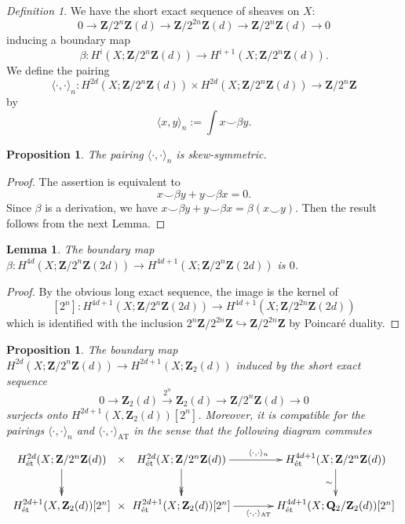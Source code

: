 \documentclass[10pt, reqno]{amsart}
\numberwithin{equation}{subsection}
\newcommand{\Q}{\mathbf{Q}}
\newcommand{\Z}{\mathbf{Z}}
\newcommand{\mrm}[1]{\mathrm{#1}}
\newcommand{\co}{\colon}
\DeclareMathOperator{\et}{\acute{e}t}
\newtheorem{lemma}[thm]{Lemma}
\newtheorem{prop}[thm]{Proposition}
\theoremstyle{remark}
\newtheorem{defn}[thm]{Definition}
\begin{document}
\begin{defn}\label{def: pairing mod 2^n} We have the short exact sequence of sheaves on $X$:
\[
0 \rightarrow \Z/2^n\Z(d) \rightarrow  \Z/2^{2n} \Z(d) \rightarrow \Z/2^n\Z(d) \rightarrow 0
\]
inducing a boundary map 
\[
\beta \colon H^i_{\et}(X; \Z/2^n\Z(d)) \rightarrow H^{i+1}_{\et}(X; \Z/2^n\Z(d)).
\] 
We define the pairing 
\[
\langle \cdot , \cdot \rangle_{n} \colon H^{2d}_{\et}(X; \Z/2^n\Z(d)) \times H^{2d}_{\et}(X; \Z/2^n\Z(d)) \rightarrow \Z/2^n\Z
\]
by 
\[
\langle x, y \rangle_n := \int x \smile \beta y .
\]
\end{defn}

\begin{prop}\label{prop: skew-symmetric}
The pairing $\langle \cdot , \cdot \rangle_n$ is skew-symmetric. 
\end{prop} 

\begin{proof}
The assertion is equivalent to 
\[
x \smile \beta y  + y \smile \beta  x  = 0.
\]
Since $\beta$ is a derivation, we have $ x \smile \beta y  + y \smile \beta  x  = \beta(x \smile y)$. Then the result follows from the next Lemma. 
\end{proof}

\begin{lemma}\label{lem: top boundary vanishes}
The boundary map $\beta  \colon H^{4d}_{\et}(X; \Z/2^n\Z(2d)) \rightarrow  H^{4d+1}_{\et}(X; \Z/2^n\Z(2d))$ is $0$. 
\end{lemma}

\begin{proof}
By the obvious long exact sequence, the image is the kernel of 
\[
[2^{n}] \co H^{4d+1}_{\et}(X; \Z/2^n\Z(2d)) \rightarrow H^{4d+1}_{\et}(X; \Z/2^{2n}\Z(2d))
\]
which is identified with the inclusion $2^n \Z/2^{2n}\Z \hookrightarrow \Z/2^{2n}\Z$ by Poincar\'{e} duality. 
\end{proof}


\begin{prop}\label{prop: compatibility}
The boundary map $H^{2d}_{\et}(X; \Z/2^n\Z(d)) \rightarrow H^{2d+1}_{\et}(X; \Z_2(d))$ induced by the short exact sequence 
\[
0 \rightarrow \Z_2(d)  \xrightarrow{2^n} \Z_2(d) \rightarrow \Z/2^n\Z(d) \rightarrow 0
\]
surjects onto $H^{2d+1}_{\et}(X, \Z_2(d))[2^n]$. Moreover, it is compatible for the pairings $\langle \cdot , \cdot \rangle_n$ and $\langle \cdot , \cdot \rangle_{\mrm{AT}}$ in the sense that the following diagram commutes
\[
\xymatrix @C=0pc{
H^{2d}_{\et}(X; \Z/2^n\Z(d)) \ar@{->>}[d] & \times &  H^{2d}_{\et}(X; \Z/2^n\Z(d))  \ar@{->>}[d]  \ar[rrrrrrr]^{\langle \cdot , \cdot \rangle_n} &&&&&&& H^{4d+1}_{\et}(X; \Z/2^n\Z(d)) \ar[d]_{\sim}  \\
H^{2d+1}_{\et}(X, \Z_2(d))[2^n] & \times &H^{2d+1}_{\et}(X; \Z_2(d))[2^n]  \ar[rrrrrrr]_{\langle \cdot , \cdot \rangle_{\mrm{AT}}} &&&&&&& H^{4d+1}_{\et}(X; \Q_2/\Z_2(d)) [2^n]
	}
\]
\end{prop}
\end{document}

